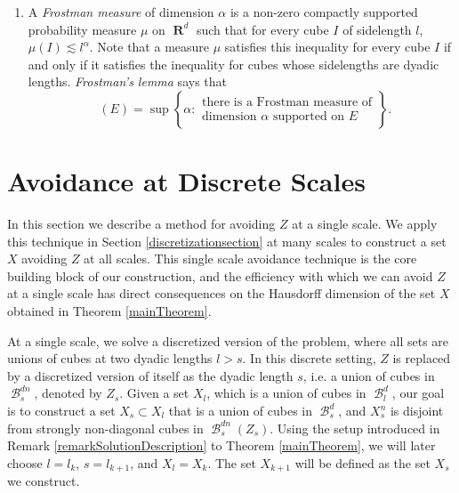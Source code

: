 \documentclass[dvipsnames,letterpaper,12pt]{article}
\numberwithin{equation}{section}
\theoremstyle{plain}
\theoremstyle{remark}
\DeclareMathOperator{\hausdim}{\dim_{\mathbf{H}}}
\DeclareMathOperator{\RR}{\mathbf{R}}
\DeclareMathOperator{\B}{\mathcal{B}}
\begin{document}
\begin{enumerate}
	\item\label{defFrostmanItem} A {\it Frostman measure} of dimension $\alpha$ is a non-zero compactly supported probability measure $\mu$ on $\RR^d$ such that for every cube $I$ of sidelength $l$, $\mu(I) \lesssim l^\alpha$. Note that a measure $\mu$ satisfies this inequality for every cube $I$ if and only if it satisfies the inequality for cubes whose sidelengths are dyadic lengths. {\it Frostman's lemma} says that
	\[ \hausdim(E) = \sup \left\{ \alpha:
		\begin{array}{c}
			\text{there is a Frostman measure of}\\
			\text{dimension $\alpha$ supported on $E$}
		\end{array} \right\}. \]
\end{enumerate}









\section{Avoidance at Discrete Scales}\label{discretesection}

In this section we describe a method for avoiding $Z$ at a single scale. We apply this technique in Section \ref{discretizationsection} at many scales to construct a set $X$ avoiding $Z$ at all scales. This single scale avoidance technique is the core building block of our construction, and the efficiency with which we can avoid $Z$ at a single scale has direct consequences on the Hausdorff dimension of the set $X$ obtained in Theorem \ref{mainTheorem}.

At a single scale, we solve a discretized version of the problem, where all sets are unions of cubes at two dyadic lengths $l > s$. In this discrete setting, $Z$ is replaced by a discretized version of itself as the dyadic length $s$, i.e. a union of cubes in $\B^{dn}_s$, denoted by $Z_s$. Given a set $X_l$, which is a union of cubes in $\B_l^d$, our goal is to construct a set $X_s \subset X_l$ that is a union of cubes in $\B_s^d$, and $X_s^n$ is disjoint from strongly non-diagonal cubes in $\B^{dn}_s(Z_s)$. Using the setup introduced in Remark \ref{remarkSolutionDescription} to Theorem \ref{mainTheorem}, we will later choose $l = l_k$, $s = l_{k+1}$, and $X_l = X_k$. The set $X_{k+1}$ will be defined as the set $X_s$ we construct.
\end{document}
